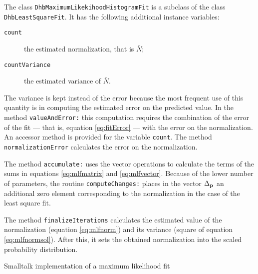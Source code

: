 \documentclass[twoside]{book}
\begin{document}
\noindent The class {\tt DhbMaximumLikekihoodHistogramFit} is a
subclass of the class {\tt DhbLeastSquareFit}. It has the
following additional instance variables:
\begin{description}
  \item[\tt count] the estimated normalization, that is $\bar{N}$;
  \item[\tt countVariance] the estimated variance of $\bar{N}$.
\end{description}
The variance is kept instead of the error because the most
frequent use of this quantity is in computing the estimated error
on the predicted value. In the method {\tt valueAndError:} this
computation requires the combination of the error of the fit ---
that is, equation \ref{eq:fitError} --- with the error on the
normalization. An accessor method is provided for the variable
{\tt count}. The method {\tt normalizationError} calculates the
error on the normalization.

The method {\tt accumulate:} uses the vector operations to
calculate the terms of the sums in equations \ref{eq:mlfmatrix}
and \ref{eq:mlfvector}. Because of the lower number of parameters,
the routine {\tt computeChanges:} places in the vector
$\Delta_{\bf p}$ an additional zero element corresponding to the
normalization in the case of the least square fit.

The method {\tt finalizeIterations} calculates the estimated value
of the normalization (equation \ref{eq:mlfnorm}) and its variance
(square of equation \ref{eq:mlfnormsol}). After this, it sets the
obtained normalization into the scaled probability distribution.

\begin{listing} Smalltalk implementation of a maximum likelihood fit \label{ls:mlf}

\end{listing}


\ifx\wholebook\relax\else
\end{document}
